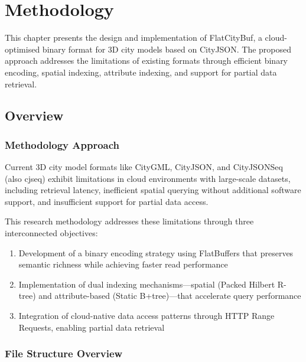 
\chapter{Methodology}
\label{methodology}

This chapter presents the design and implementation of FlatCityBuf, a cloud-optimised binary format for 3D city models based on CityJSON. The proposed approach addresses the limitations of existing formats through efficient binary encoding, spatial indexing, attribute indexing, and support for partial data retrieval.

\section{Overview}
\label{methodology:overview}

\subsection{Methodology Approach}
\label{methodology:overview:approach}

Current 3D city model formats like CityGML, CityJSON, and CityJSONSeq (also \ac{cjseq}) exhibit limitations in cloud environments with large-scale datasets, including retrieval latency, inefficient spatial querying without additional software support, and insufficient support for partial data access.

This research methodology addresses these limitations through three interconnected objectives:

\begin{enumerate}
    \item Development of a binary encoding strategy using FlatBuffers that preserves semantic richness while achieving faster read performance
    \item Implementation of dual indexing mechanisms—spatial (Packed Hilbert R-tree) and attribute-based (Static B+tree)—that accelerate query performance
    \item Integration of cloud-native data access patterns through HTTP Range Requests, enabling partial data retrieval
\end{enumerate}

\subsection{File Structure Overview}
\label{methodology:overview:file_structure}

